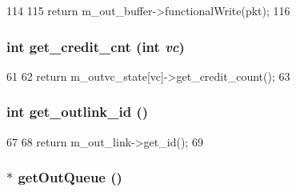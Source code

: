 \begin{DoxyCode}
114 {
115     return m_out_buffer->functionalWrite(pkt);
116 }
\end{DoxyCode}
\hypertarget{classOutputUnit__d_aae610e2b37c22ba110e223da68a1e302}{
\subsubsection[{get\_\-credit\_\-cnt}]{\setlength{\rightskip}{0pt plus 5cm}int get\_\-credit\_\-cnt (int {\em vc})}}
\label{classOutputUnit__d_aae610e2b37c22ba110e223da68a1e302}



\begin{DoxyCode}
61     {
62         return m_outvc_state[vc]->get_credit_count();
63     }
\end{DoxyCode}
\hypertarget{classOutputUnit__d_a3292695c6544ec346fd7f0a661d237d6}{
\subsubsection[{get\_\-outlink\_\-id}]{\setlength{\rightskip}{0pt plus 5cm}int get\_\-outlink\_\-id ()}}
\label{classOutputUnit__d_a3292695c6544ec346fd7f0a661d237d6}



\begin{DoxyCode}
67     {
68         return m_out_link->get_id();
69     }
\end{DoxyCode}
\hypertarget{classOutputUnit__d_a672f508b05cb3b48c7c02e4ecea475bc}{
\subsubsection[{getOutQueue}]{ $\ast$ getOutQueue ()}}
\label{classOutputUnit__d_a672f508b05cb3b48c7c02e4ecea475bc}



